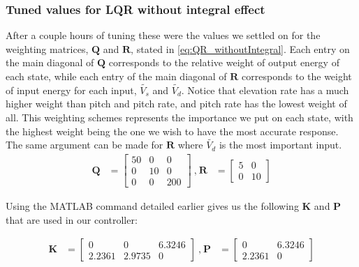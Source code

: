 \subsubsection{Tuned values for LQR without integral effect}
After a couple hours of tuning these were the values we settled on for the weighting matrices, $\mathbf{Q}$ and $\mathbf{R}$, stated in \cref{eq:QR_withoutIntegral}. Each entry on the main diagonal of $\mathbf{Q}$ corresponds to the relative weight of output energy of each state, while each entry of the main diagonal of $\mathbf{R}$ corresponds to the weight of input energy for each input, $\tilde{V_s}$ and $\tilde{V_d}$. Notice that elevation rate has a much higher weight than pitch and pitch rate, and pitch rate has the lowest weight of all. This weighting schemes represents the importance we put on each state, with the highest weight being the one we wish to have the most accurate response. The same argument can be made for $\mathbf{R}$ where $\tilde{V_d}$ is the most important input.
\begin{equation}\label{eq:QR_withoutIntegral}
    \begin{aligned}
        \mathbf{Q} &=
        \begin{bmatrix}
            50 & 0 & 0 \\
            0 & 10 & 0 \\
            0 & 0 & 200 
        \end{bmatrix}
        \: \textrm{,} \:
        \mathbf{R} &=
        \begin{bmatrix}
            5 & 0 \\
            0 & 10 
        \end{bmatrix}
    \end{aligned}
\end{equation}

Using the MATLAB command detailed earlier gives us the following $\mathbf{K}$ and $\mathbf{P}$ that are used in our controller:

\begin{equation}\label{eq:KP_WithoutIntegral}
    \begin{aligned}
        \mathbf{K} &=
        \begin{bmatrix}
            0 & 0 & 6.3246 \\
            2.2361 & 2.9735 & 0 
        \end{bmatrix}
        \: \textrm{,} \:
        \mathbf{P} &=
        \begin{bmatrix}
            0 & 6.3246 \\
            2.2361 & 0 
        \end{bmatrix}
    \end{aligned}
\end{equation}

